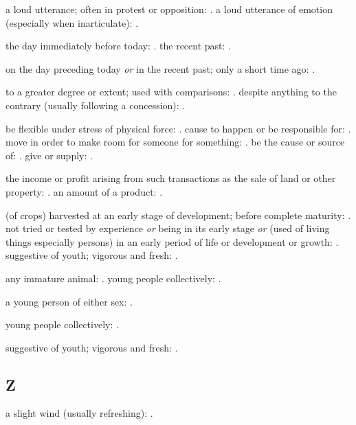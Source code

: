   a loud utterance; often in protest or opposition: . a loud utterance of emotion (especially when inarticulate): .

  the day immediately before today: . the recent past: .

  on the day preceding today \textit{or} in the recent past; only a short time ago: .

  to a greater degree or extent; used with comparisons: . despite anything to the contrary (usually following a concession): .

  be flexible under stress of physical force: . cause to happen or be responsible for: . move in order to make room for someone for something: . be the cause or source of: . give or supply: .

  the income or profit arising from such transactions as the sale of land or other property: . an amount of a product: .

  (of crops) harvested at an early stage of development; before complete maturity: . not tried or tested by experience \textit{or} being in its early stage \textit{or} (used of living things especially persons) in an early period of life or development or growth: . suggestive of youth; vigorous and fresh: .

  any immature animal: . young people collectively: .

  a young person of either sex: .

  young people collectively: .

  suggestive of youth; vigorous and fresh: .

\subsection*{Z}

  a slight wind (usually refreshing): .

